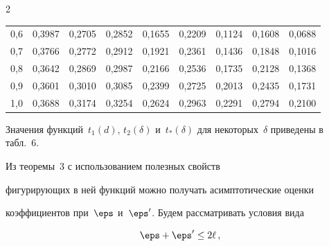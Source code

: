 \begin{multicols}{2}
\begin{table}[b]
\begin{center}
\begin{tabular}{|c|c|c|c|c|c|c|c|c|}
0,6 &   0,3987  &   0,2705  &   0,2852  &   0,1655  &   0,2209  &    0,1124 &   0,1608  &   0,0688  \\


0,7 &   0,3766  &   0,2772  &   0,2912  &   0,1921  &   0,2361  &    0,1436 &   0,1848  &   0,1016  \\


0,8 &   0,3642  &   0,2869  &   0,2987  &   0,2166  &   0,2536  &    0,1735 &   0,2128  &   0,1368  \\


0,9 &   0,3601  &   0,3010  &   0,3085  &   0,2399  &   0,2725  &    0,2013 &   0,2435  &   0,1731  \\


1,0 &   0,3688  &   0,3174  &   0,3254  &   0,2624  &   0,2963  &    0,2291 &   0,2794  &   0,2100  \\


 \hline


\end{tabular}


\end{center}


\end{table}








\smallskip





Значения функций~$t_1(d)$, $t_2(\delta)$ и~$t_*(\delta)$ для некоторых~$\delta$ приведены в табл.~6.








Из теоремы~3 с использованием полезных свойств


фигурирующих в ней функций можно получать асимптотические оценки


коэффициентов при~$\eps$ и~$\eps'$. Будем рассматривать условия вида 


\begin{equation}


\eps+\eps'\le2\ell\,,


\label{eps+eps'<=2ell}


\end{equation}










\end{multicols}
